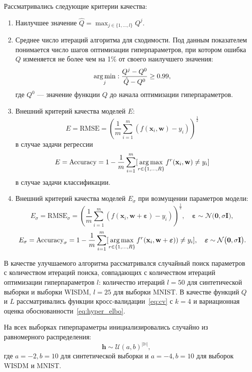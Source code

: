 Рассматривались следующие критерии качества:
\begin{enumerate}
\item Наилучшее значение $\hat{Q} = \max_{j \in \{1, \dots, l\}}Q^j$.
\item Среднее число итераций алгоритма для сходимости. Под данным показателем понимается число шагов оптимизации гиперпараметров, при котором ошибка $Q$ изменяется не более чем на 1\% от своего наилучшего значения:
\[
    \operatorname*{arg\,min}_{j}: \frac{Q^j - Q^0}{\hat{Q} - Q^0} \geq 0.99,
\]
где $Q^0$ --- значение функции $Q$ до начала оптимизации гиперпараметров.

\item Внешний критерий качества моделей $E$:
\[
    E = \text{RMSE} = \left (\frac{1}{m}\sum_{i=1}^m (f(\mathbf{x}_i, \mathbf{w})-y_i)\right)^{\frac{1}{2}}
\]
в случае задачи регрессии 
\[
    E = \text{Accuracy} = 1 - \frac{1}{m}\sum_{i=1}^m [\operatorname*{arg\,max}_{r \in \{1, \dots, R\}}f^r(\mathbf{x}_i, \mathbf{w}) \neq y_i]
\]
в случае задачи классификации.

\item Внешний критерий качества моделей $E_\sigma$ при возмущении параметров модели:
\[
    E_\sigma = \text{RMSE}_\sigma = \left (\frac{1}{m}\sum_{i=1}^m (f(\mathbf{x}_i, \mathbf{w} + \boldsymbol{\varepsilon})-y_i)\right)^{\frac{1}{2}}, \quad \boldsymbol{\varepsilon} \sim \mathcal{N}\bigl(\mathbf{0}, \sigma\mathbf{I}\bigr),
\]
\[
    E_\sigma  = \text{Accuracy}_\sigma  = 1 - \frac{1}{m}\sum_{i=1}^m [\operatorname*{arg\,max}_{r \in \{1, \dots, R\}}f^r(\mathbf{x}_i, \mathbf{w }  + \boldsymbol{\varepsilon})) \neq y_i],  \quad \boldsymbol{\varepsilon} \sim \mathcal{N}\bigl(\mathbf{0}, \sigma\mathbf{I}\bigr).
\]

\end{enumerate}

В качестве улучшаемого алгоритма рассматривался случайный поиск параметров с количеством итераций поиска, совпадающих с количеством итераций оптимизации гиперпараметров $l$: количество итераций $l=50$ для синтетической выборки и выборки WISDM, $l=25$ для выборки MNIST. В качестве функций $Q$ и $L$ рассматривались функции кросс-валидации~\eqref{eq:cv} с $k=4$ и вариационная оценка обоснованности~\eqref{eq:hyper_elbo}. 




На всех выборках гиперпараметры инициализировались случайно из равномерного распределения:
\[
    \mathbf{h} \sim \mathcal{U}(a,b)^{|\mathbb{H}|},
\]
где $a = -2, b = 10$ для синтетической выборки и $a = -4, b = 10$ для выборок WISDM и MNIST.

